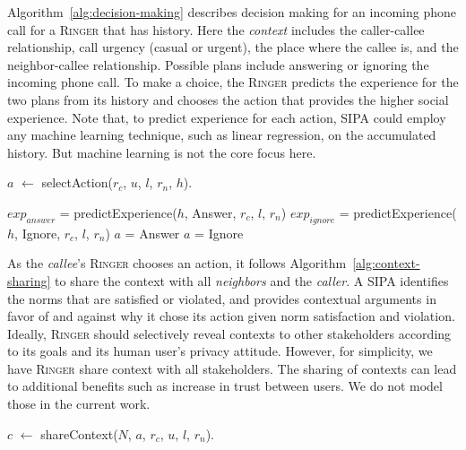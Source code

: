 \documentclass[11pt,          %
               phd,           %
               onehalfspacing %
               ]{ncsuthesis}
\newcommand{\fsc}{\textsc}
\newcommand{\fsl}{\textsl}
\newcommand{\ringer}{\fsc{Ringer}\xspace}
\newcommand{\mps}[1]{\textcolor{blue}{MPS:~~#1}}
\begin{document}
Algorithm~\ref{alg:decision-making} describes decision making for an
incoming phone call for a \ringer that has history. Here the
\fsl{context} includes the caller-callee relationship, call urgency
(casual or urgent), the place where the callee is, and the
neighbor-callee relationship. Possible plans include answering or
ignoring the incoming phone call. To make a choice, the \ringer predicts
the experience for the two plans from its history and chooses the action
that provides the higher social experience. Note that, to predict
experience for each action, SIPA could employ any machine learning
technique, such as linear regression, on the accumulated history. But
machine learning is not the core focus here.


\begin{algorithm}[ht]
\caption{$a$ $\leftarrow$ selectAction($r_c$, $u$, $l$, $r_n$, $h$).}
\label{alg:decision-making}
$exp_{answer}$ = predictExperience($h$, Answer, $r_c$, $l$, $r_n$)\;
$exp_{ignore}$ = predictExperience($h$, Ignore, $r_c$, $l$, $r_n$)\;
{$a$ = Answer}
{$a$ = Ignore}
\end{algorithm}


As the \fsl{callee}'s \ringer chooses an action, it follows
Algorithm~\ref{alg:context-sharing} to share the context with all
\fsl{neighbors} and the \fsl{caller}. A SIPA identifies the norms that
are satisfied or violated, and provides contextual arguments in favor of
and against why it chose its action given norm satisfaction and
violation. Ideally, \ringer should selectively reveal contexts to other
stakeholders according to its goals and its human user's privacy
attitude. However, for simplicity, we have \ringer share context with
all stakeholders. The sharing of contexts can lead to additional
benefits such as increase in trust between users. We do not model those
in the current work.


\begin{algorithm}[ht]
\caption{$c$ $\leftarrow$ shareContext($N$, $a$, $r_c$, $u$, $l$, $r_n$).}
\label{alg:context-sharing}

\end{algorithm}
\end{document}
